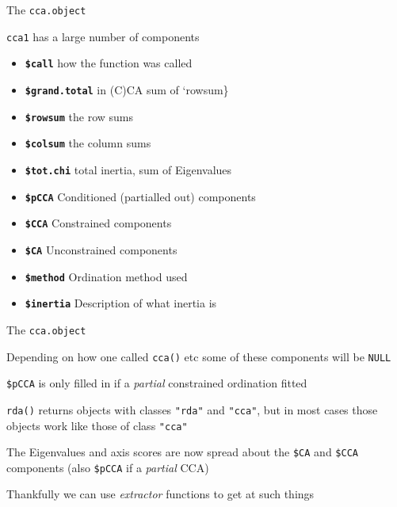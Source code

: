 \documentclass[10pt,ignorenonframetext,compress, aspectratio=169]{beamer}
\begin{document}
\begin{frame}{The \texttt{cca.object}}

\texttt{cca1} has a large number of components

\begin{itemize}
\itemsep1pt\parskip0pt
\item
  \textbf{\texttt{\$call}} how the function was called
\item
  \textbf{\texttt{\$grand.total}} in (C)CA sum of `rowsum\}
\item
  \textbf{\texttt{\$rowsum}} the row sums
\item
  \textbf{\texttt{\$colsum}} the column sums
\item
  \textbf{\texttt{\$tot.chi}} total inertia, sum of Eigenvalues
\item
  \textbf{\texttt{\$pCCA}} Conditioned (partialled out) components
\item
  \textbf{\texttt{\$CCA}} Constrained components
\item
  \textbf{\texttt{\$CA}} Unconstrained components
\item
  \textbf{\texttt{\$method}} Ordination method used
\item
  \textbf{\texttt{\$inertia}} Description of what inertia is
\end{itemize}

\end{frame}

\begin{frame}{The \texttt{cca.object}}

Depending on how one called \texttt{cca()} etc some of these components
will be \texttt{NULL}

\texttt{\$pCCA} is only filled in if a \emph{partial} constrained
ordination fitted

\texttt{rda()} returns objects with classes \texttt{"rda"} and
\texttt{"cca"}, but in most cases those objects work like those of class
\texttt{"cca"}

The Eigenvalues and axis scores are now spread about the \texttt{\$CA}
and \texttt{\$CCA} components (also \texttt{\$pCCA} if a \emph{partial}
CCA)

Thankfully we can use \emph{extractor} functions to get at such things

\end{frame}
\end{document}
